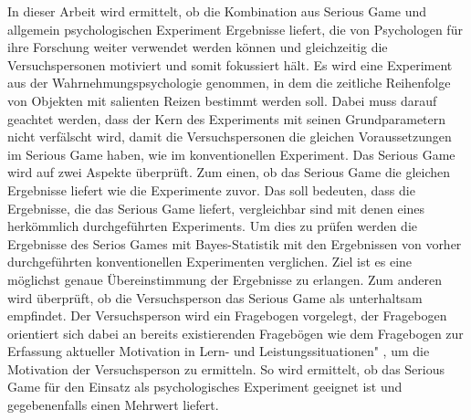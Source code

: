 
In dieser Arbeit wird ermittelt, ob die Kombination aus Serious Game und allgemein psychologischen Experiment Ergebnisse liefert, die von Psychologen für ihre Forschung weiter verwendet werden können und gleichzeitig die Versuchspersonen motiviert und somit fokussiert hält. Es wird eine Experiment aus der Wahrnehmungspsychologie genommen, in dem die zeitliche Reihenfolge von Objekten mit salienten Reizen bestimmt werden soll. Dabei muss darauf geachtet werden, dass der Kern des Experiments mit seinen Grundparametern nicht verfälscht wird, damit die Versuchspersonen die gleichen Voraussetzungen im Serious Game haben, wie im konventionellen Experiment.
Das Serious Game wird auf zwei Aspekte überprüft. Zum einen, ob das Serious Game die gleichen Ergebnisse liefert wie die Experimente zuvor. Das soll bedeuten, dass die Ergebnisse, die das Serious Game liefert, vergleichbar sind mit denen eines herkömmlich durchgeführten Experiments. Um dies zu prüfen werden die Ergebnisse des Serios Games mit Bayes-Statistik mit den Ergebnissen von vorher durchgeführten konventionellen Experimenten verglichen. Ziel ist es eine möglichst genaue Übereinstimmung der Ergebnisse zu erlangen.
Zum anderen wird überprüft, ob die Versuchsperson das Serious Game als unterhaltsam empfindet. Der Versuchsperson wird ein Fragebogen vorgelegt, der Fragebogen orientiert sich dabei an bereits existierenden Fragebögen wie dem \grqq Fragebogen zur Erfassung aktueller Motivation in Lern- und Leistungssituationen" \cite{rheinberg2001fam}, um die Motivation der Versuchsperson zu ermitteln.
So wird ermittelt, ob das Serious Game für den Einsatz als psychologisches Experiment geeignet ist und gegebenenfalls einen Mehrwert liefert.
